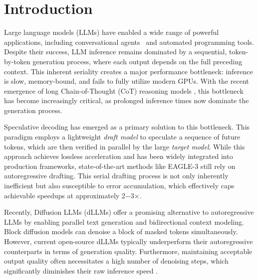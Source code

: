 \section{Introduction}

Large language models (LLMs) have enabled a wide range of powerful applications, including conversational agents~\cite{yang2025qwen3technicalreport, Guo_2025} and automated programming tools. Despite their success, LLM inference remains dominated by a sequential, token-by-token generation process, where each output depends on the full preceding context. This inherent seriality creates a major performance bottleneck: inference is slow, memory-bound, and fails to fully utilize modern GPUs. With the recent emergence of long Chain-of-Thought (CoT) reasoning models \cite{openai2024openaio1card, Guo_2025}, this bottleneck has become increasingly critical, as prolonged inference times now dominate the generation process.

Speculative decoding \cite{leviathan2023fastinferencetransformersspeculative, li2025eaglespeculativesamplingrequires, li2024eagle2fasterinferencelanguage, li2025eagle3scalinginferenceacceleration, cai2024medusasimplellminference} has emerged as a primary solution to this bottleneck. This paradigm employs a lightweight \textit{draft model} to speculate a sequence of future tokens, which are then verified in parallel by the large \textit{target model}. While this approach achieves lossless acceleration and has been widely integrated into production frameworks, state-of-the-art methods like EAGLE-3 \cite{li2025eagle3scalinginferenceacceleration} still rely on autoregressive drafting. This serial drafting process is not only inherently inefficient but also susceptible to error accumulation, which effectively caps achievable speedups at approximately 2$-$3$\times$.

Recently, Diffusion LLMs (dLLMs) \cite{nie2025largelanguagediffusionmodels} offer a promising alternative to autoregressive LLMs by enabling parallel text generation and bidirectional context modeling. Block diffusion models \cite{arriola2025blockdiffusioninterpolatingautoregressive,cheng2025sdarsynergisticdiffusionautoregressionparadigm, wu2025fastdllmv2efficientblockdiffusion} can denoise a block of masked tokens simultaneously. However, current open-source dLLMs typically underperform their autoregressive counterparts in terms of generation quality. Furthermore, maintaining acceptable output quality often necessitates a high number of denoising steps, which significantly diminishes their raw inference speed \cite{qian2026d3llmultrafastdiffusionllm}.

